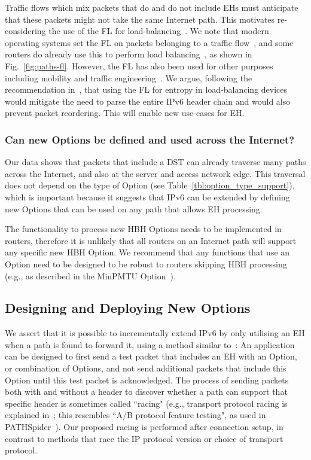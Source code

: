 \documentclass[conference]{IEEEtran}
\begin{document}
Traffic flows which mix packets that do and do not include EHs must anticipate that these packets might not take the same Internet path.
This motivates re-considering the use of the FL for load-balancing~\cite{RFC6437}. We note that modern operating systems set the FL on packets belonging to a traffic flow~\cite{os-fl}, and some routers do already use this to perform load balancing~\cite{lb-classification}, as shown in Fig.~\ref{fig:paths-fl}. However, the FL has also been used for other purposes~\cite{flow-label-approaches} including mobility and traffic engineering~\cite{traffic-eng}. We argue, following the recommendation in~\cite{RFC6437}, that using the FL for entropy in load-balancing devices would mitigate the need to parse the entire IPv6 header chain and would also prevent packet reordering. This will enable new use-cases for EH.


\subsubsection{Can new Options be defined and used across the Internet?}
Our data shows that packets that include a DST can already traverse many paths across the Internet, and also at the server and access network edge. 
This traversal does not depend on the type of Option (see Table~\ref{tbl:option_type_support}), which is important because it suggests that IPv6 can be extended by defining new Options that can be used on any path that allows EH processing. 

The functionality to process new HBH Options needs to be implemented in routers, therefore it is unlikely that all routers on an Internet path will support any specific new HBH Option. We recommend that any functions that use an Option need to be designed to be robust to routers skipping HBH processing (e.g., as described in the MinPMTU  Option~\cite{rfc9268,rfc9343}).


\subsection{Designing and Deploying New Options}

We assert that  it is possible to incrementally extend IPv6 by only utilising an EH when a path is found to forward it,
using a method similar to~\cite{rfc9268}:
An application can be designed to first send a test packet that includes an EH with an Option, or combination of Options, and not send additional packets that include this Option until this test packet is acknowledged. The process of sending packets both with and without a header to discover whether a path can support that specific header is sometimes called ``racing" (e.g., transport protocol racing is explained in~\cite{ietf-taps-arch-18}; this resembles ``A/B protocol feature testing", as used in PATHSpider~\cite{learmonth2016pathspider}). Our proposed racing is performed after connection setup, in contrast to methods that race the IP protocol version or choice of transport protocol. 
\end{document}
